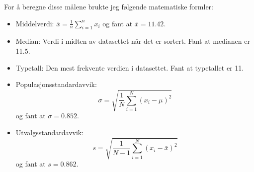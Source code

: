 \documentclass{article}
\begin{document}
For å beregne disse målene brukte jeg følgende matematiske formler:
\begin{itemize}
    \item Middelverdi: $\bar{x} = \frac{1}{n}\sum_{i=1}^{n} x_i$ og fant at $\bar{x} = 11.42$.
    \item Median: Verdi i midten av datasettet når det er sortert. Fant at medianen er 11.5.
    \item Typetall: Den mest frekvente verdien i datasettet. Fant at typetallet er 11.
    \item Populasjonsstandardavvik: 
    \[
    \sigma = \sqrt{\frac{1}{N}\sum_{i=1}^{N}(x_i - \mu)^2}
    \] 
    og fant at $\sigma = 0.852$.
    \item Utvalgsstandardavvik: 
    \[
    s = \sqrt{\frac{1}{N-1}\sum_{i=1}^{N}(x_i - \bar{x})^2}
    \]
    og fant at $s = 0.862$.
\end{itemize}
\end{document}
